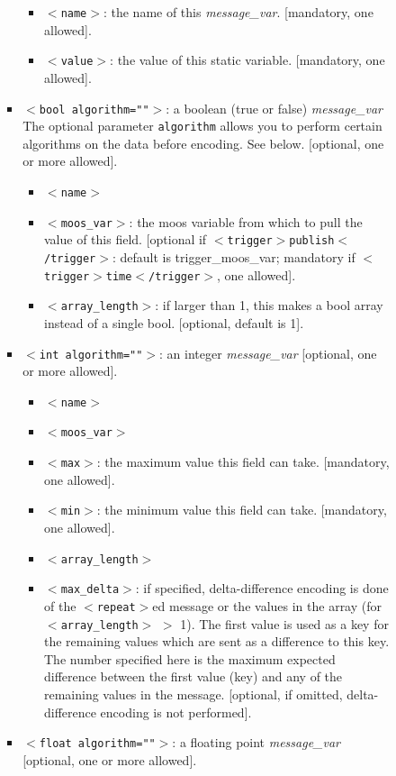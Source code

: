 \documentclass[11pt, letterpaper, oneside]{memoir}
\newcommand{\xmltag}[1]{\texttt{$<$#1$>$}}
\begin{document}
\begin{itemize}
\begin{itemize}
\begin{itemize}
\begin{itemize}
\begin{itemize}
\item \xmltag{name}: the name of this \textit{message\_var}. [mandatory, one allowed].
\item \xmltag{value}: the value of this static variable. [mandatory, one allowed].
\end{itemize}
\item \xmltag{bool algorithm=""}: a boolean (true or false) \textit{message\_var}  The optional parameter \verb|algorithm| allows you to perform certain algorithms on the data before encoding. See below. [optional, one or more allowed]. 
\begin{itemize}
\item \xmltag{name}
\item \xmltag{moos\_var}: the moos variable from which to pull the value of this field. [optional if \xmltag{trigger$>$publish$<$/trigger}: default is trigger\_moos\_var; mandatory if \xmltag{trigger$>$time$<$/trigger}, one allowed]. 
\item \xmltag{array\_length}: if larger than 1, this makes a bool array instead of a single bool. [optional, default is  1].
\end{itemize}
\item \xmltag{int algorithm=""}: an integer \textit{message\_var} [optional, one or more allowed]. 
\begin{itemize}
\item \xmltag{name}
\item \xmltag{moos\_var}
\item \xmltag{max}: the maximum value this field can take. [mandatory, one allowed].
\item \xmltag{min}: the minimum value this field can take. [mandatory, one allowed].
\item \xmltag{array\_length}
\item \xmltag{max\_delta}: if specified, delta-difference encoding is done of the \xmltag{repeat}ed message or the values in the array (for \xmltag{array\_length} $>$ 1). The first value is used as a key for the remaining values which are sent as a difference to this key. The number specified here is the maximum expected difference between the first value (key) and any of the remaining values in the message. [optional, if omitted, delta-difference encoding is not performed].
\end{itemize}
\item \xmltag{float algorithm=""}: a floating point \textit{message\_var} [optional, one or more allowed].

\end{itemize}
\end{itemize}
\end{itemize}
\end{itemize}
\end{document}
